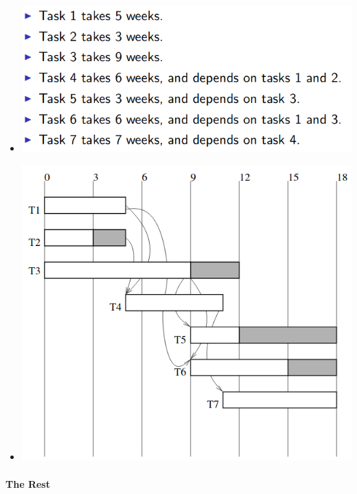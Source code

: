 \documentclass[a4paper]{article}
\providecommand{\tightlist}{%
  \setlength{\itemsep}{0pt}\setlength{\parskip}{0pt}}
\let\oldparagraph\paragraph
\renewcommand{\paragraph}[1]{\oldparagraph{#1}\mbox{}}
\begin{document}
\begin{itemize}
\begin{itemize}
    \begin{itemize}
    \tightlist
    \item
      \includegraphics{2C-SE.assets/1543585250853.png}
    \item
      \includegraphics{2C-SE.assets/1543585265509.png}
    \end{itemize}
  \end{itemize}
\end{itemize}

\hypertarget{the-rest}{%
\paragraph{The Rest}\label{the-rest}}
\end{document}
